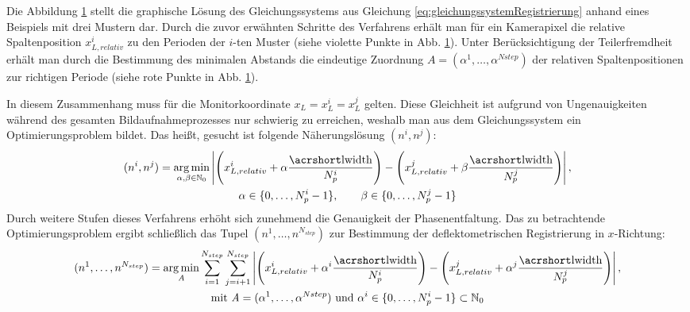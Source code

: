 %
{
	\begin{figure}[H]
		\centering
		
		\label{tikz:abbBestimmungEindeutigerPosition}
	\end{figure}
}
%
\noindent
Die Abbildung \ref{tikz:abbBestimmungEindeutigerPosition} stellt die graphische Lösung des Gleichungssystems aus Gleichung \ref{eq:gleichungssystemRegistrierung} anhand eines Beispiels mit drei Mustern dar.
Durch die zuvor erwähnten Schritte des Verfahrens erhält man für ein Kamerapixel die relative Spaltenposition $x_{L,relativ}^i$ zu den Perioden der $i$-ten Muster (siehe violette Punkte in Abb. \ref{tikz:abbBestimmungEindeutigerPosition}).
Unter Berücksichtigung der Teilerfremdheit erhält man durch die Bestimmung des minimalen Abstands die eindeutige Zuordnung $\mathrm{\textit{A}} = (\alpha^1,\ldots,\alpha^{N{step}})$ der relativen Spaltenpositionen zur richtigen Periode (siehe rote Punkte in Abb. \ref{tikz:abbBestimmungEindeutigerPosition}).

\p
In diesem Zusammenhang muss für die Monitorkoordinate $x_L = x_L^i = x_L^j$ gelten.
Diese Gleichheit ist aufgrund von Ungenauigkeiten während des gesamten Bildaufnahmeprozesses nur schwierig zu erreichen, weshalb man aus dem Gleichungssystem ein Optimierungsproblem bildet.
Das heißt, gesucht ist folgende Näherungslösung $(n^i, n^j)$:
%
\begin{equation}\label{eq:optimierungsProblem_zweiStufen}
	\begin{gathered}	
		(n^i, n^j) = \argmin_{\alpha, \beta \in \mathbb{N}_0}
		\left\lvert
			\Bigg(
				x_{L,relativ}^i + \alpha \dfrac{\acrshortmath{lwidth}}{N_p^i}
			\Bigg)
			-
			\Bigg(		
				x_{L,relativ}^j + \beta \dfrac{\acrshortmath{lwidth}}{N_p^j}
			\Bigg)
		\right\rvert,\\
		\alpha \in \lbrace 0,\ldots, N_p^i - 1\rbrace,
		\qquad
		\beta \in \lbrace 0,\ldots, N_p^j - 1\rbrace
	\end{gathered}
\end{equation}
%
Durch weitere Stufen dieses Verfahrens erhöht sich zunehmend die Genauigkeit der Phasenentfaltung.
Das zu betrachtende Optimierungsproblem ergibt schließlich das Tupel $(n^1,\ldots, n^{N_{step}})$ zur Bestimmung der deflektometrischen Registrierung in $x$-Richtung:
%
\begin{equation}\label{eq:optimierungsProblem_mehrstufig}
	\begin{gathered}	
		(n^1,\ldots, n^{N_{step}}) = \argmin_{\mathrm{\textit{A}}}
		\sum\limits_{i = 1}^{N_{step}}
		\sum\limits_{j = i + 1}^{N_{step}}
		\left\lvert
			\Bigg(
				x_{L,relativ}^i + \alpha^i \dfrac{\acrshortmath{lwidth}}{N_p^i}
			\Bigg)
			-
			\Bigg(		
				x_{L,relativ}^j + \alpha^j \dfrac{\acrshortmath{lwidth}}{N_p^j}
			\Bigg)
		\right\rvert,\\
		\text{mit} ~\mathrm{\textit{A}} = (\alpha^1,\ldots,\alpha^{N{step}}) ~\text{und} ~\alpha^i \in \lbrace 0,\ldots, N_p^i - 1 \rbrace \subset \mathbb{N}_0
	\end{gathered}
\end{equation}

